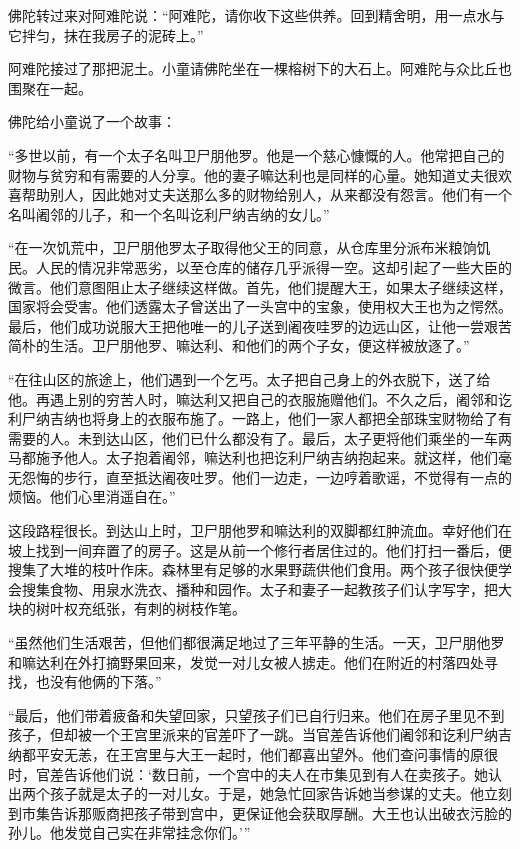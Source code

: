 \documentclass[12pt,twoside,openany]{book}
\begin{document}
佛陀转过来对阿难陀说：“阿难陀，请你收下这些供养。回到精舍明，用一点水与它拌匀，抹在我房子的泥砖上。”

阿难陀接过了那把泥土。小童请佛陀坐在一棵榕树下的大石上。阿难陀与众比丘也围聚在一起。

佛陀给小童说了一个故事：

“多世以前，有一个太子名叫卫尸朋他罗。他是一个慈心慷慨的人。他常把自己的财物与贫穷和有需要的人分享。他的妻子嘛达利也是同样的心量。她知道丈夫很欢喜帮助别人，因此她对丈夫送那么多的财物给别人，从来都没有怨言。他们有一个名叫阇邻的儿子，和一个名叫讫利尸纳吉纳的女儿。”

“在一次饥荒中，卫尸朋他罗太子取得他父王的同意，从仓库里分派布米粮饷饥民。人民的情况非常恶劣，以至仓库的储存几乎派得一空。这却引起了一些大臣的微言。他们意图阻止太子继续这样做。首先，他们提醒大王，如果太子继续这样，国家将会受害。他们透露太子曾送出了一头宫中的宝象，使用权大王也为之愕然。最后，他们成功说服大王把他唯一的儿子送到阇夜哇罗的边远山区，让他一尝艰苦简朴的生活。卫尸朋他罗、嘛达利、和他们的两个子女，便这样被放逐了。”

“在往山区的旅途上，他们遇到一个乞丐。太子把自己身上的外衣脱下，送了给他。再遇上别的穷苦人时，嘛达利又把自己的衣服施赠他们。不久之后，阇邻和讫利尸纳吉纳也将身上的衣服布施了。一路上，他们一家人都把全部珠宝财物给了有需要的人。未到达山区，他们已什么都没有了。最后，太子更将他们乘坐的一车两马都施予他人。太子抱着阇邻，嘛达利也把讫利尸纳吉纳抱起来。就这样，他们毫无怨悔的步行，直至抵达阇夜吐罗。他们一边走，一边哼着歌谣，不觉得有一点的烦恼。他们心里消遥自在。”

这段路程很长。到达山上时，卫尸朋他罗和嘛达利的双脚都红肿流血。幸好他们在坡上找到一间弃置了的房子。这是从前一个修行者居住过的。他们打扫一番后，便搜集了大堆的枝叶作床。森林里有足够的水果野蔬供他们食用。两个孩子很快便学会搜集食物、用泉水洗衣、播种和园作。太子和妻子一起教孩子们认字写字，把大块的树叶权充纸张，有刺的树枝作笔。

“虽然他们生活艰苦，但他们都很满足地过了三年平静的生活。一天，卫尸朋他罗和嘛达利在外打摘野果回来，发觉一对儿女被人掳走。他们在附近的村落四处寻找，也没有他俩的下落。”

“最后，他们带着疲备和失望回家，只望孩子们已自行归来。他们在房子里见不到孩子，但却被一个王宫里派来的官差吓了一跳。当官差告诉他们阇邻和讫利尸纳吉纳都平安无恙，在王宫里与大王一起时，他们都喜出望外。他们查问事情的原很时，官差告诉他们说：‘数日前，一个宫中的夫人在市集见到有人在卖孩子。她认出两个孩子就是太子的一对儿女。于是，她急忙回家告诉她当参谋的丈夫。他立刻到市集告诉那贩商把孩子带到宫中，更保证他会获取厚酬。大王也认出破衣污脸的孙儿。他发觉自己实在非常挂念你们。’”
\end{document}
